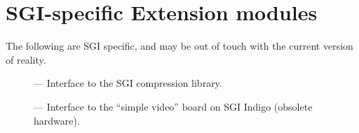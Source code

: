\section{SGI-specific Extension modules}

The following are SGI specific, and may be out of touch with the
current version of reality.

\begin{description}
\item[]
--- Interface to the SGI compression library.

\item[]
--- Interface to the ``simple video'' board on SGI Indigo
(obsolete hardware).
\end{description}
